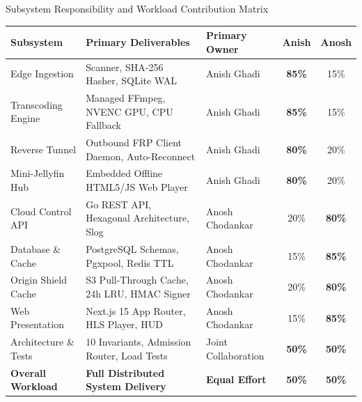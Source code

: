 \vspace{-0.1cm}
\begin{center}
\captionsetup{type=table}
\caption{Subsystem Responsibility and Workload Contribution Matrix}
\label{tab:contribution_matrix}
\vspace{0.1cm}
\footnotesize
\renewcommand{\arraystretch}{0.92}
\begin{tabularx}{\textwidth}{P{3.4cm}LLcc}
\toprule
\textbf{Subsystem} & \textbf{Primary Deliverables} & \textbf{Primary Owner} & \textbf{Anish} & \textbf{Anosh} \\
\midrule
Edge Ingestion & Scanner, SHA-256 Hasher, SQLite WAL & Anish Ghadi & \textbf{85\%} & 15\% \\
Transcoding Engine & Managed FFmpeg, NVENC GPU, CPU Fallback & Anish Ghadi & \textbf{85\%} & 15\% \\
Reverse Tunnel & Outbound FRP Client Daemon, Auto-Reconnect & Anish Ghadi & \textbf{80\%} & 20\% \\
Mini-Jellyfin Hub & Embedded Offline HTML5/JS Web Player & Anish Ghadi & \textbf{80\%} & 20\% \\
Cloud Control API & Go REST API, Hexagonal Architecture, Slog & Anosh Chodankar & 20\% & \textbf{80\%} \\
Database \& Cache & PostgreSQL Schemas, Pgxpool, Redis TTL & Anosh Chodankar & 15\% & \textbf{85\%} \\
Origin Shield Cache & S3 Pull-Through Cache, 24h LRU, HMAC Signer & Anosh Chodankar & 20\% & \textbf{80\%} \\
Web Presentation & Next.js 15 App Router, HLS Player, HUD & Anosh Chodankar & 15\% & \textbf{85\%} \\
Architecture \& Tests & 10 Invariants, Admission Router, Load Tests & Joint Collaboration & \textbf{50\%} & \textbf{50\%} \\
\midrule
\textbf{Overall Workload} & \textbf{Full Distributed System Delivery} & \textbf{Equal Effort} & \textbf{50\%} & \textbf{50\%} \\
\bottomrule
\end{tabularx}
\end{center}
